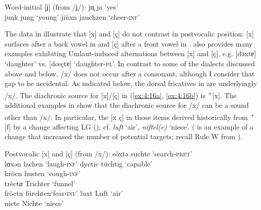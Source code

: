 \ea%
  Word-initial [ʝ] (from /ʝ/):\label{ex:4:15}
\ea jɑͅͅͅ    \tab [ʝɔː]   \tab ja    \tab ‘yes’  \\
    juŋk  \tab [ʝʊŋk]  \tab jung  \tab ‘young’  \label{ex:4:15a}
\ex jiŭxn \tab [ʝiuxn̩] \tab jauchzen \tab ‘cheer-\textsc{inf}’ \label{ex:4:15b}
\z
\z 

The data in  illustrate that [x] and [ç] do not contrast in postvocalic position: [x] surfaces after a back vowel in  and [ç] after a front vowel in . \citet{Holthausen1886} also provides many examples exhibiting Umlaut-induced alternations between [x] and [ç], e.g. [dɔxtɐ] ‘daughter’ vs. [dœçtɐ] ‘daughter-\textsc{pl}’. In contrast to some of the dialects discussed above and below, /x/ does not occur after a consonant, although I consider that gap to be accidental. As indicated below, the dorsal fricatives in  are underlyingly /x/. The diachronic source for [x]/[ç] in (\ref{ex:4:16a}, \ref{ex:4:16b}) is  \textsuperscript{+}[x]. The additional examples in  show that the diachronic source for /x/ can be a sound other than /x/. In particular, the [x ç] in those items derived historically from  \textsuperscript{+}[f] by a change affecting LG (); cf.  \textit{luft} ‘air’,  \textit{niftel(e)} ‘niece’. ( is an example of a change that increased the number of potential targets; recall Rule W from ).

\ea%
  Postvocalic [x] and [ç] (from /x/):\label{ex:4:16}
  \ea\label{ex:4:16a} sòxtə           \tab [sɔxtə]  \tab suchte   \tab ‘search-\textsc{pret}’\\
      lɑxən           \tab [lɑxən]  \tab lachen   \tab ‘laugh-\textsc{inf}’    
  \ex\label{ex:4:16b} dyctic          \tab [dʏçtɪç] \tab tüchtig  \tab ‘capable’               \\
      kröcn           \tab [kʀœçn̩] \tab  husten  \tab  ‘cough-\textsc{inf}’   \\
      trèct\textit{ɑ} \tab [tʀɛçtɐ] \tab Trichter \tab ‘funnel’                \\
      fröctn          \tab [fʀœçtn̩]\tab  fürchten\tab  ‘fear\textsc{{}-inf}’  
  \ex\label{ex:4:16c} luxt            \tab [lʊxt]   \tab Luft     \tab ‘air’                   \\
      nicte           \tab [nɪçtə]  \tab Nichte   \tab ‘niece’                 
  \z
\z 

